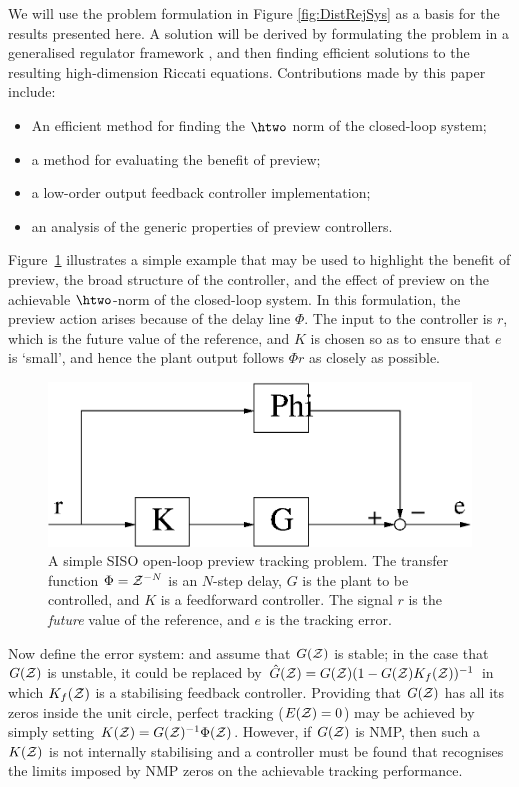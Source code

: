 We will use the problem formulation in Figure \ref{fig:DistRejSys} as a basis for the results presented here. A solution will be derived
by formulating the problem in a generalised regulator framework \cite{LimebeerGreen,ZDG}, and then finding efficient solutions to the resulting high-dimension Riccati equations. Contributions made by this paper include:
\begin{itemize}
\item An efficient method for finding the $\htwo$ norm of the closed-loop system;
\item a method for evaluating the benefit of preview;
\item a low-order output feedback controller implementation;
\item an analysis of the  generic properties of preview controllers.
\end{itemize}

Figure~\ref{fig:SimpleSISOPrev} illustrates a simple example that may be used to highlight the benefit of preview, the broad structure of the controller, and the effect of preview on the achievable $\htwo$-norm of the closed-loop system. In this formulation, the preview action arises because of the delay line $\Phi$. The input to the controller is $r$, which is the future value of the reference, and $K$ is chosen so as to ensure that $e$ is `small', and hence the plant output follows $\Phi r$ as closely as possible. 
\begin{figure}
\stdcontrolfrags
\begin{center}
\includegraphics[width=0.4\hsize]{./diags/SimpleExampleNominalNoK2.eps}
\end{center}
\caption{A simple SISO open-loop preview tracking problem. The transfer function $\Phi=\mathcal{Z}^{-N}$ is an $N$-step delay, $G$ is the plant to be controlled, and $K$ is a feedforward controller. The signal $r$ is the \textit{future} value of the reference, and $e$ is the tracking error.}
\label{fig:SimpleSISOPrev}
\end{figure}
%
Now define the error system:
and assume that $G(\mathcal{Z})$ is stable; in the case that $G(\mathcal{Z})$ is unstable, it could be replaced by $\hat G(\mathcal{Z})=G(\mathcal{Z})(1-G(\mathcal{Z})K_f(\mathcal{Z}))^{-1}$ in which $K_f(\mathcal{Z})$ is a stabilising feedback controller. Providing that $G(\mathcal{Z})$ has all its zeros inside the unit circle, perfect tracking ($E(\mathcal{Z})=0$) may be achieved by simply setting $K(\mathcal{Z})=G(\mathcal{Z})^{-1}\Phi(\mathcal{Z})$. 
However, if $G(\mathcal{Z})$ is {NMP}, then such a $K(\mathcal{Z})$ is not internally stabilising and a controller must be found that recognises the limits imposed by {NMP} zeros on the achievable tracking performance. %

